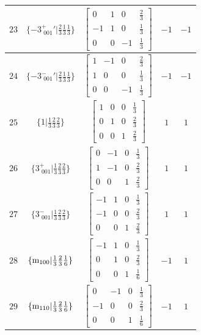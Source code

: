 \documentclass[fleqn,8pt]{jsarticle}
\begin{document}
\begin{longtable}{ccccc}
$ 23 $ & $ \{-3^{+}_{\,\,001}{}'|\frac{2}{3} \frac{1}{3} \frac{1}{3}\} $ & $ \begin{bmatrix} 0 & 1 & 0 & \frac{2}{3} \\ -1 & 1 & 0 & \frac{1}{3} \\ 0 & 0 & -1 & \frac{1}{3} \end{bmatrix} $ & $ -1 $ & $ -1 $ \\ \hline
$ 24 $ & $ \{-3^{-}_{\,\,001}{}'|\frac{2}{3} \frac{1}{3} \frac{1}{3}\} $ & $ \begin{bmatrix} 1 & -1 & 0 & \frac{2}{3} \\ 1 & 0 & 0 & \frac{1}{3} \\ 0 & 0 & -1 & \frac{1}{3} \end{bmatrix} $ & $ -1 $ & $ -1 $ \\ \hline
$ 25 $ & $ \{1|\frac{1}{3} \frac{2}{3} \frac{2}{3}\} $ & $ \begin{bmatrix} 1 & 0 & 0 & \frac{1}{3} \\ 0 & 1 & 0 & \frac{2}{3} \\ 0 & 0 & 1 & \frac{2}{3} \end{bmatrix} $ & $ 1 $ & $ 1 $ \\ \hline
$ 26 $ & $ \{3^{+}_{\,\,001}|\frac{1}{3} \frac{2}{3} \frac{2}{3}\} $ & $ \begin{bmatrix} 0 & -1 & 0 & \frac{1}{3} \\ 1 & -1 & 0 & \frac{2}{3} \\ 0 & 0 & 1 & \frac{2}{3} \end{bmatrix} $ & $ 1 $ & $ 1 $ \\ \hline
$ 27 $ & $ \{3^{-}_{\,\,001}|\frac{1}{3} \frac{2}{3} \frac{2}{3}\} $ & $ \begin{bmatrix} -1 & 1 & 0 & \frac{1}{3} \\ -1 & 0 & 0 & \frac{2}{3} \\ 0 & 0 & 1 & \frac{2}{3} \end{bmatrix} $ & $ 1 $ & $ 1 $ \\ \hline
$ 28 $ & $ \{{\rm m}_{100}|\frac{1}{3} \frac{2}{3} \frac{1}{6}\} $ & $ \begin{bmatrix} -1 & 1 & 0 & \frac{1}{3} \\ 0 & 1 & 0 & \frac{2}{3} \\ 0 & 0 & 1 & \frac{1}{6} \end{bmatrix} $ & $ -1 $ & $ 1 $ \\ \hline
$ 29 $ & $ \{{\rm m}_{110}|\frac{1}{3} \frac{2}{3} \frac{1}{6}\} $ & $ \begin{bmatrix} 0 & -1 & 0 & \frac{1}{3} \\ -1 & 0 & 0 & \frac{2}{3} \\ 0 & 0 & 1 & \frac{1}{6} \end{bmatrix} $ & $ -1 $ & $ 1 $ \\ \hline

\end{longtable}
\end{document}
